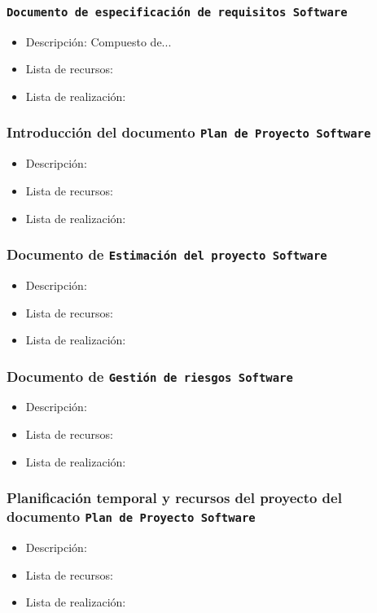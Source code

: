\documentclass[spanish,a4paper,11pt, twoside]{report}	%
\begin{document}
			\subsubsection{\texttt{Documento de especificación de requisitos Software}}
			\begin{itemize}	
				\item{Descripción:} Compuesto de...
				\item{Lista de recursos:}
				\item{Lista de realización:}
			\end{itemize}	

			\subsubsection{Introducción del documento \texttt{Plan de Proyecto Software}}
			\begin{itemize}	
				\item{Descripción:}
				\item{Lista de recursos:}
				\item{Lista de realización:}
			\end{itemize}		

			\subsubsection{Documento de \texttt{Estimación del proyecto Software}}
			\begin{itemize}	
				\item{Descripción:}
				\item{Lista de recursos:}
				\item{Lista de realización:}
			\end{itemize}		
			
			\subsubsection{Documento de \texttt{Gestión de riesgos Software}}
			\begin{itemize}	
				\item{Descripción:}
				\item{Lista de recursos:}
				\item{Lista de realización:}
			\end{itemize}		

			\subsubsection{Planificación temporal y recursos del proyecto del documento \texttt{Plan de Proyecto Software}}
			\begin{itemize}	
				\item{Descripción:}
				\item{Lista de recursos:}
				\item{Lista de realización:}
			\end{itemize}	
\end{document}
